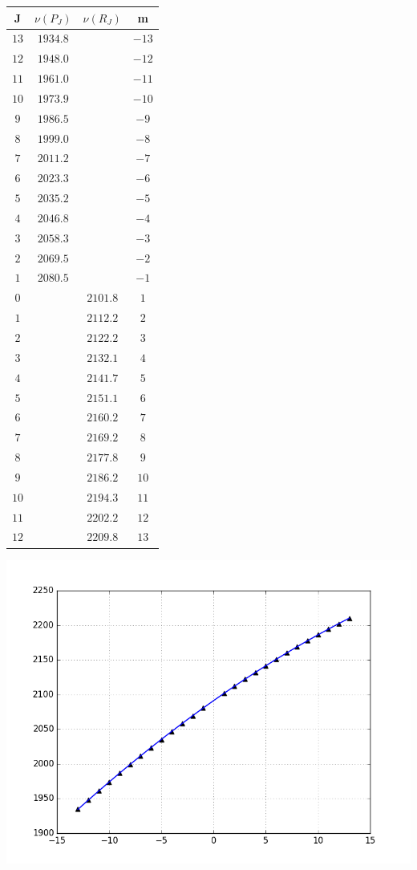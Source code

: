 \documentclass[13pt]{extarticle}
\newcommand{\lb}{\left(}
\newcommand{\rb}{\right)}
\begin{document}
\begin{table}
	\begin{minipage}{0.4\textwidth}
		\centering
		\begin{tabular}{|c|c|c|c|}
			\hline
			J & $\nu \lb P_J \rb$ & $\nu \lb R_J \rb$ & m \\
			\hline
			$13$ & $1934.8$ & & $-13$ \\
			$12$ & $1948.0$ & & $-12$ \\
			$11$ & $1961.0$ & & $-11$ \\
			$10$ & $1973.9$ & & $-10$ \\
			$9$  & $1986.5$ & & $-9$ \\
			$8$  & $1999.0$ & & $-8$ \\
			$7$  & $2011.2$ & & $-7$ \\
			$6$  & $2023.3$ & & $-6$ \\
			$5$  & $2035.2$ & & $-5$ \\
			$4$  & $2046.8$ & & $-4$ \\
			$3$  & $2058.3$ & & $-3$ \\
			$2$  & $2069.5$ & & $-2$ \\
			$1$  & $2080.5$ & & $-1$ \\
			$0$  & & $2101.8$ & $1$ \\
			$1$  & & $2112.2$ & $2$ \\
			$2$  & & $2122.2$ & $3$ \\
			$3$  & & $2132.1$ & $4$ \\
			$4$  & & $2141.7$ & $5$ \\
			$5$  & & $2151.1$ & $6$ \\
			$6$  & & $2160.2$ & $7$ \\
			$7$  & & $2169.2$ & $8$ \\
			$8$  & & $2177.8$ & $9$ \\
			$9$  & & $2186.2$ & $10$ \\
			$10$ & & $2194.3$ & $11$ \\
			$11$ & & $2202.2$ & $12$ \\
			$12$ & & $2209.8$ & $13$ \\
			\hline
		\end{tabular}
	\end{minipage}
	\begin{minipage}{0.6\textwidth}
		\centering
		\includegraphics[scale=0.6]{pictures/pic1.png}

\end{minipage}
\end{table}
\end{document}
